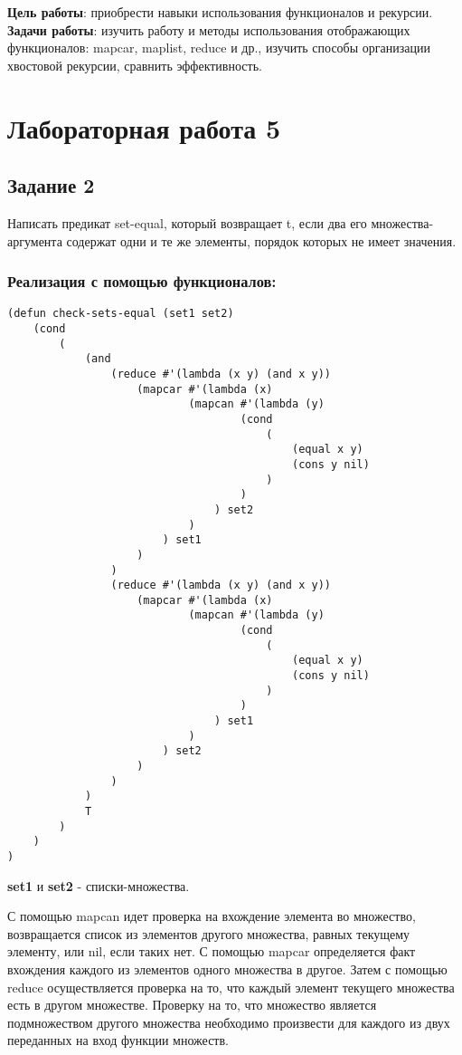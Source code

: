 \documentclass[a4paper,12pt]{article}
\begin{document}
	


\textbf{Цель работы}: приобрести навыки использования функционалов и рекурсии.\\

\textbf{Задачи работы}: изучить работу и методы использования отображающих функционалов: mapcar, maplist, reduce и др., изучить способы организации хвостовой рекурсии, сравнить эффективность.

\section*{Лабораторная работа 5}

\subsection*{Задание 2}

Написать предикат set-equal, который возвращает t, если два его множества-аргумента содержат одни и те же элементы, порядок которых не имеет значения.

\subsubsection*{Реализация с помощью функционалов:}
\begin{lstlisting}[caption=Функция проверки эквивалентности двух множеств]
(defun check-sets-equal (set1 set2)
	(cond 
		(
			(and
				(reduce #'(lambda (x y) (and x y))
					(mapcar #'(lambda (x) 
							(mapcan #'(lambda (y)
									(cond 
										(
											(equal x y)
											(cons y nil)
										)
									)
								) set2
							)
						) set1
					)
				)
				(reduce #'(lambda (x y) (and x y))
					(mapcar #'(lambda (x)
							(mapcan #'(lambda (y)
									(cond 
										(
											(equal x y)
											(cons y nil)
										)
									)
								) set1
							)
						) set2
					)
				)
			)
			T
		)
	)
)
\end{lstlisting}

\textbf{set1} и \textbf{set2} - списки-множества.

С помощью mapcan идет проверка на вхождение элемента во множество, возвращается список из элементов другого множества, равных текущему элементу, или nil, если таких нет. С помощью mapcar определяется факт вхождения каждого из элементов одного множества в другое. Затем с помощью reduce осуществляется проверка на то, что каждый элемент текущего множества есть в другом множестве. Проверку на то, что множество является подмножеством другого множества необходимо произвести для каждого из двух переданных на вход функции множеств.
\end{document}
